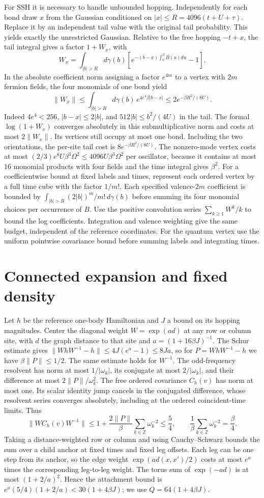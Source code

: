 \documentclass[11pt]{article}
\begin{document}
For SSH it is necessary to handle unbounded hopping. Independently for each bond draw $x$ from the Gaussian conditioned on $|x|\le R=4096(t+U+\tau)$. Replace it by an independent tail value with the original tail probability. This yields exactly the unrestricted Gaussian. Relative to the free hopping $-t+x$, the tail integral gives a factor $1+W_x$, with
\[
 W_x=\int_{|b|>R} d\gamma(b)\left[e^{-(b-x)\int_0^\beta B(u)du}-1\right].
\]
In the absolute coefficient norm assigning a factor $e^{4m}$ to a vertex with $2m$ fermion fields, the four monomials of one bond yield
\[
 \|W_x\|\le \int_{|b|>R}d\gamma(b)\,e^{4e^4\beta|b-x|}
 \le 2e^{-\beta R^2/(8U)}.
\]
Indeed $4e^4<256$, $|b-x|\le2|b|$, and $512|b|\le b^2/(4U)$ in the tail. The formal $\log(1+W_x)$ converges absolutely in this submultiplicative norm and costs at most $2\|W_x\|$. Its vertices still occupy at most one bond. Including the two orientations, the per-site tail cost is $8e^{-\beta R^2/(8U)}$. The nonzero-mode vertex costs at most $(2/3)e^8 U\beta^3\Omega^2\le4096 U\beta^3\Omega^2$ per oscillator, because it contains at most $16$ monomial products with four fields and the time integral gives $\beta^2$.
For a coefficientwise bound at fixed labels and times, represent each ordered vertex by a full time cube with the factor $1/m!$. Each specified valence-$2m$ coefficient is bounded by $\int_{|b|>R}(2|b|)^m/m!\,d\gamma(b)$ before summing its four monomial choices per occurrence of $B$. Use the positive convolution series $\sum_{k\ge1}W^k/k$ to bound the log coefficients. Integration and valence weighting give the same budget, independent of the reference coordinates. For the quantum vertex use the uniform pointwise covariance bound before summing labels and integrating times.

\section{Connected expansion and fixed density}
Let $h$ be the reference one-body Hamiltonian and $J$ a bound on its hopping magnitudes. Center the diagonal weight $W=\exp(a d)$ at any row or column site, with $d$ the graph distance to that site and $a=(1+16\beta J)^{-1}$. The Schur estimate gives $\|WhW^{-1}-h\|\le4J(e^a-1)\le8Ja$, so for $P=WhW^{-1}-h$ we have $\beta\|P\|\le1/2$. The same estimate holds for $W^{-1}$. The odd-frequency resolvent has norm at most $1/|\omega_k|$, its conjugate at most $2/|\omega_k|$, and their difference at most $2\|P\|/\omega_k^2$. The free ordered covariance $C_h(v)$ has norm at most one. Its scalar identity jump cancels in the conjugated difference, whose resolvent series converges absolutely, including at the ordered coincident-time limits. Thus
\[
\|WC_h(v)W^{-1}\|\le1+\frac{2\|P\|}{\beta}\sum_{k\in\mathbb Z}\omega_k^{-2}\le\frac54,
\qquad \frac1\beta\sum_{k\in\mathbb Z}\omega_k^{-2}=\frac{\beta}{4}.
\]
Taking a distance-weighted row or column and using Cauchy--Schwarz bounds the sum over a child anchor at fixed times and fixed leg offsets. Each leg can be one step from its anchor, so the edge weight $\exp(a d(x,x')/2)$ costs at most $e^a$ times the corresponding leg-to-leg weight. The torus sum of $\exp(-a d)$ is at most $(1+2/a)^2$. Hence the attachment bound is $e^a(5/4)(1+2/a)<30(1+4\beta J)$; we use $Q=64(1+4\beta J)$.
\end{document}
